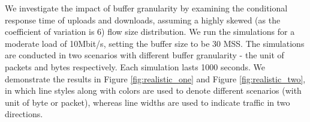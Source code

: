 \documentclass[preprint,12pt]{elsarticle}
\begin{document}
We investigate the impact of buffer granularity by examining the conditional response time of uploads and downloads, assuming a highly skewed (as the coefficient of variation is 6) flow size distribution. We run the simulations for a moderate load of 10Mbit/s, setting the buffer size to be 30 MSS. The simulations are conducted  in two scenarios with different buffer granularity - the unit of packets and bytes respectively. Each simulation lasts 1000 seconds. We demonstrate the results in Figure \ref{fig:realistic_one} and Figure \ref{fig:realistic_two}, in which line styles along with colors are used to denote different scenarios (with unit of byte or packet), whereas line widths are used to indicate traffic in two directions. 

\begin{figure}[ht!]
  \centering

\end{figure}
\end{document}
